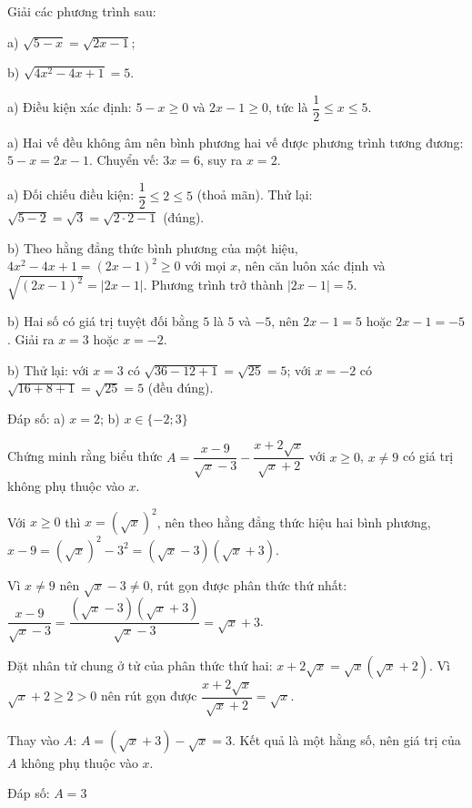 \begin{problem}[9DS-CAN-039]
Giải các phương trình sau:

a) $\sqrt{5 - x} = \sqrt{2x - 1}$;

b) $\sqrt{4x^2 - 4x + 1} = 5$.

\begin{solution}
a) Điều kiện xác định: $5 - x \geq 0$ và $2x - 1 \geq 0$, tức là $\dfrac{1}{2} \leq x \leq 5$.

a) Hai vế đều không âm nên bình phương hai vế được phương trình tương đương: $5 - x = 2x - 1$. Chuyển vế: $3x = 6$, suy ra $x = 2$.

a) Đối chiếu điều kiện: $\dfrac{1}{2} \leq 2 \leq 5$ (thoả mãn). Thử lại: $\sqrt{5 - 2} = \sqrt{3} = \sqrt{2 \cdot 2 - 1}$ (đúng).

b) Theo hằng đẳng thức bình phương của một hiệu, $4x^2 - 4x + 1 = (2x - 1)^2 \geq 0$ với mọi $x$, nên căn luôn xác định và $\sqrt{(2x - 1)^2} = |2x - 1|$. Phương trình trở thành $|2x - 1| = 5$.

b) Hai số có giá trị tuyệt đối bằng $5$ là $5$ và $-5$, nên $2x - 1 = 5$ hoặc $2x - 1 = -5$. Giải ra $x = 3$ hoặc $x = -2$.

b) Thử lại: với $x = 3$ có $\sqrt{36 - 12 + 1} = \sqrt{25} = 5$; với $x = -2$ có $\sqrt{16 + 8 + 1} = \sqrt{25} = 5$ (đều đúng).

Đáp số: a) $\boxed{x = 2}$; b) $\boxed{x \in \{-2; 3\}}$
\end{solution}
\end{problem}

\begin{problem}[9DS-CAN-040]
Chứng minh rằng biểu thức $A = \dfrac{x - 9}{\sqrt{x} - 3} - \dfrac{x + 2\sqrt{x}}{\sqrt{x} + 2}$ với $x \geq 0$, $x \neq 9$ có giá trị không phụ thuộc vào $x$.

\begin{solution}
Với $x \geq 0$ thì $x = (\sqrt{x})^2$, nên theo hằng đẳng thức hiệu hai bình phương, $x - 9 = (\sqrt{x})^2 - 3^2 = (\sqrt{x} - 3)(\sqrt{x} + 3)$.

Vì $x \neq 9$ nên $\sqrt{x} - 3 \neq 0$, rút gọn được phân thức thứ nhất: $\dfrac{x - 9}{\sqrt{x} - 3} = \dfrac{(\sqrt{x} - 3)(\sqrt{x} + 3)}{\sqrt{x} - 3} = \sqrt{x} + 3$.

Đặt nhân tử chung ở tử của phân thức thứ hai: $x + 2\sqrt{x} = \sqrt{x}(\sqrt{x} + 2)$. Vì $\sqrt{x} + 2 \geq 2 > 0$ nên rút gọn được $\dfrac{x + 2\sqrt{x}}{\sqrt{x} + 2} = \sqrt{x}$.

Thay vào $A$: $A = (\sqrt{x} + 3) - \sqrt{x} = 3$. Kết quả là một hằng số, nên giá trị của $A$ không phụ thuộc vào $x$.

Đáp số: $\boxed{A = 3}$
\end{solution}
\end{problem}

